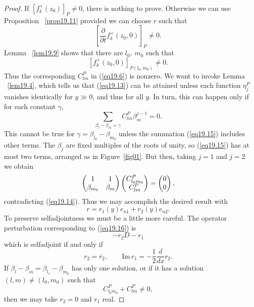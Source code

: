 \documentclass{surv-l}
\theoremstyle{plain}
\theoremstyle{definition}
\numberwithin{equation}{chapter}
\begin{document}
\begin{proof} If $[f_{k}^{+}(z_{0})]_{P}\neq 0$, there is nothing to prove. Otherwise we can use Proposition ~\ref{prop19.11} provided we can choose $r$ such that
\setcounter{equation}{12}
\begin{equation}\label{eq19.13}
\left[\frac{\partial}{\partial t}f_{k}^{+}(z_{0},0)\right]_{P}\neq 0.
\end{equation}
Lemma ~\ref{lem19.9} shows that there are $l_{0},\ m_{0}$ such that
\begin{equation}\label{eq19.14}
[f_{k}^{+}(z_{0},0)]_{P(l_{0},m_{0})}\neq 0.
\end{equation}
Thus the corresponding $C_{lm}^{P}$ in (\ref{eq19.6}) is nonzero. We want to invoke Lemma ~\ref{lem19.4}, which tells us that (\ref{eq19.13}) can be attained unless each function $\eta_{j}^{P}$ vanishes identically for $y\gg 0$, and thus for all $y$. In turn, this can happen only if for each constant $\gamma,$
\begin{equation}\label{eq19.15}
\sum_{\beta_{l}-\beta_{m}=\gamma}C_{lm}^{P}\beta_{m}^{j-1}=0.
\end{equation}
This cannot be true for $\gamma = \beta_{l_{0}}-\beta_{m_{0}}$ unless the summation (\ref{eq19.15}) includes other terms. The $\beta_{j}$ are fixed multiples of the roots of unity, so (\ref{eq19.15}) has at most two terms, arranged as in Figure~\ref{fig01}. But then, taking $j = 1$ and $j = 2$ we obtain
\begin{align*}
\left(\begin{array}{@{}cc@{}}
1 & 1\\
\beta_{m_{0}} & \beta_{m}
\end{array}\right)\left(\begin{array}{@{}c@{}}
C_{l_{0}m_{0}}^{P}\\
C_{lm}^{P}\end{array}\right)=\left(\begin{array}{@{}c@{}}
0\\
0
\end{array}\right),
\end{align*}
contradicting (\ref{eq19.14}). Thus we may accomplish the desired result with
\begin{equation}\label{eq19.16}
r=r_{1}(y)e_{n1}+r_{2}(y)e_{n2}.
\end{equation}
To preserve selfadjointness we must be a little more careful. The operator perturbation corresponding to (\ref{eq19.16}) is
\begin{equation*}
-r_{2}D-r_{1}
\end{equation*}
which is selfadjoint if and only if
\begin{equation}\label{eq19.17}
r_{2}=\overline{r}_{2},\qquad \mathrm{Im}\, r_{1} = -\frac{1}{2}\frac{d}{dx}r_{2}.
\end{equation}
If $\beta_{l}-\beta_{m} = \beta_{l_{1}}-\beta_{m_{0}}$ has only one solution, or if it has a solution $(l,m) \neq (l_{0},m_{0})$ such that
\begin{equation*}
C_{l_{0}m_{0}}^{P}+C_{lm}^{P}\neq 0,
\end{equation*}
then we may take $r_{2}=0$ and $r_{1}$ real.


\end{proof}
\end{document}
